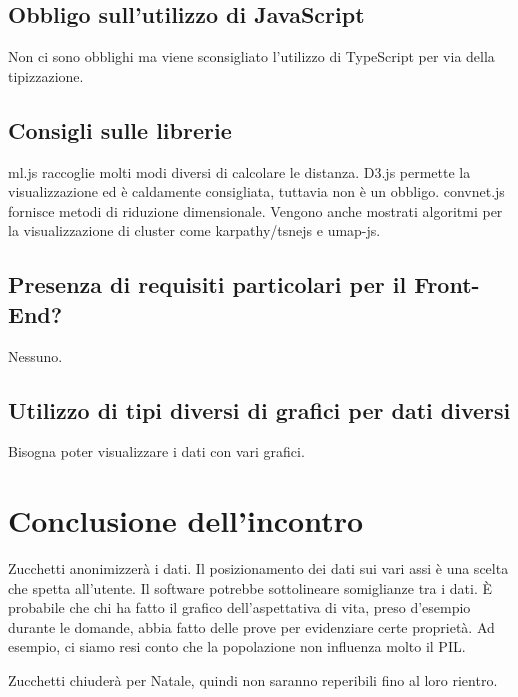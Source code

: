 \documentclass{article}
\begin{document}
    \subsection{Obbligo sull'utilizzo di JavaScript}
    \label{sub:domanda_16}
    Non ci sono obblighi ma viene sconsigliato l'utilizzo di TypeScript per via della tipizzazione.

    \subsection{Consigli sulle librerie}
    \label{sub:domanda_17}
    ml.js raccoglie molti modi diversi di calcolare le distanza. D3.js permette la visualizzazione ed è caldamente consigliata, tuttavia non è un obbligo. 
    convnet.js fornisce metodi di riduzione dimensionale. Vengono anche mostrati algoritmi per la visualizzazione di cluster come karpathy/tsnejs e umap-js. 

    \subsection{Presenza di requisiti particolari per il Front-End?}
    \label{sub:domanda_18}
    Nessuno.

    \subsection{Utilizzo di tipi diversi di grafici per dati diversi}
    \label{sub:domanda_19}
    Bisogna poter visualizzare i dati con vari grafici. 

\section{Conclusione dell'incontro}
\label{sec:conclusione}
Zucchetti anonimizzerà i dati. Il posizionamento dei dati sui vari assi è una scelta che spetta all'utente. Il software potrebbe sottolineare somiglianze tra i dati. È probabile che chi ha fatto il grafico dell'aspettativa di vita, preso d'esempio durante le domande, abbia fatto delle prove per evidenziare certe proprietà. Ad esempio, ci siamo resi conto che la popolazione non influenza molto il PIL.

Zucchetti chiuderà per Natale, quindi non saranno reperibili fino al loro rientro.
\end{document}
